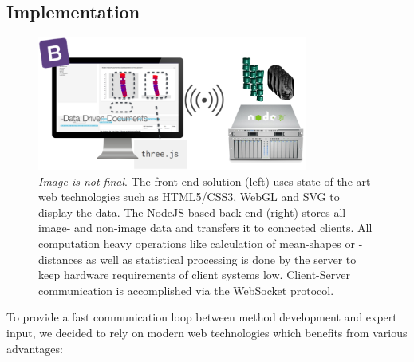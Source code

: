 \documentclass[journal]{style/vgtc} 			          %
\begin{document}

\subsection{Implementation}
\begin{figure}[htb]
 \centering
 \label{fig:technologies}
 \includegraphics[width=3.5in]{figures/technologies}
 \caption{\emph{Image is not final}. The front-end solution (left) uses state of the art web technologies such as HTML5/CSS3, WebGL and SVG to display the data.
 The NodeJS based back-end (right) stores all image- and non-image data and transfers it to connected clients.
 All computation heavy operations like calculation of mean-shapes or -distances as well as statistical processing is done by the server to keep hardware requirements of client systems low. 
 Client-Server communication is accomplished via the WebSocket protocol.
 }
\end{figure}
%
To provide a fast communication loop between method development and expert input, we decided to rely on modern web technologies which benefits from various advantages:
\end{document}
